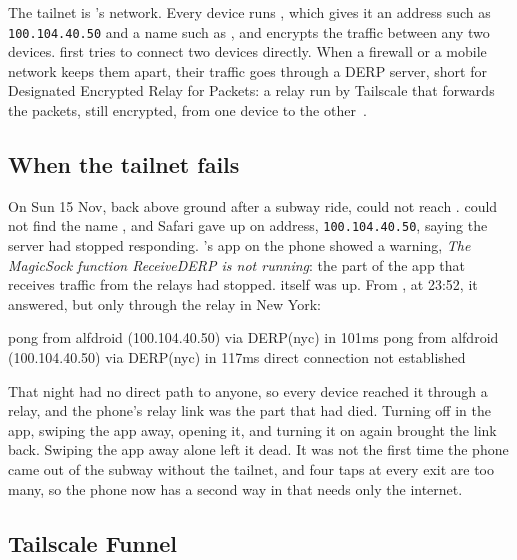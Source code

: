 \documentclass[11pt,a4paper]{article}
\begin{document}
The tailnet is 's network. Every device runs , which gives it an address such as \texttt{100.104.40.50} and a name such as , and encrypts the traffic between any two devices.  first tries to connect two devices directly. When a firewall or a mobile network keeps them apart, their traffic goes through a DERP server, short for Designated Encrypted Relay for Packets: a relay run by Tailscale that forwards the packets, still encrypted, from one device to the other~\cite{derp}.

\subsection*{When the tailnet fails}

On Sun 15 Nov, back above ground after a subway ride,  could not reach .  could not find the name , and Safari gave up on  address, \texttt{100.104.40.50}, saying the server had stopped responding. 's app on the phone showed a warning, \textit{The MagicSock function ReceiveDERP is not running}: the part of the app that receives traffic from the relays had stopped.  itself was up. From , at 23:52, it answered, but only through the relay in New York:

\begin{cmdout}
pong from alfdroid (100.104.40.50) via DERP(nyc) in 101ms
pong from alfdroid (100.104.40.50) via DERP(nyc) in 117ms
direct connection not established
\end{cmdout}

That night  had no direct path to anyone, so every device reached it through a relay, and the phone's relay link was the part that had died. Turning  off in the app, swiping the app away, opening it, and turning it on again brought the link back. Swiping the app away alone left it dead. It was not the first time the phone came out of the subway without the tailnet, and four taps at every exit are too many, so the phone now has a second way in that needs only the internet.

\subsection*{Tailscale Funnel}
\end{document}
